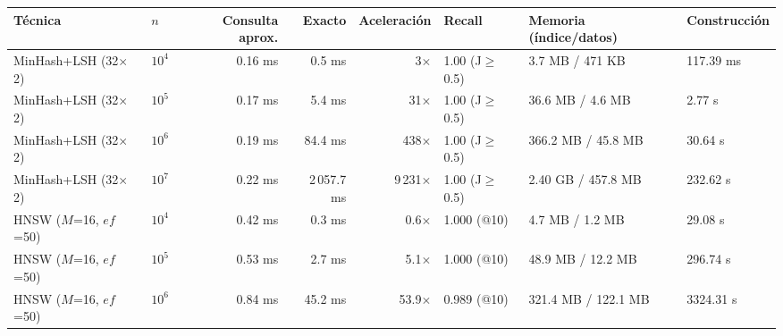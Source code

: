 \setlength{\tabcolsep}{4pt}
\begin{tabular}{@{}llrrrlll@{}}\toprule
Técnica & $n$ & Consulta aprox. & Exacto & Aceleración & Recall & Memoria (índice/datos) & Construcción \\\midrule
MinHash+LSH (32$\times$2) & $10^4$ & 0.16 ms & 0.5 ms & 3$\times$ & 1.00 (J$\ge$0.5) & 3.7 MB / 471 KB & 117.39 ms \\
MinHash+LSH (32$\times$2) & $10^5$ & 0.17 ms & 5.4 ms & 31$\times$ & 1.00 (J$\ge$0.5) & 36.6 MB / 4.6 MB & 2.77 s \\
MinHash+LSH (32$\times$2) & $10^6$ & 0.19 ms & 84.4 ms & 438$\times$ & 1.00 (J$\ge$0.5) & 366.2 MB / 45.8 MB & 30.64 s \\
MinHash+LSH (32$\times$2) & $10^7$ & 0.22 ms & 2\,057.7 ms & 9\,231$\times$ & 1.00 (J$\ge$0.5) & 2.40 GB / 457.8 MB & 232.62 s \\
HNSW ($M$=16, $ef$=50) & $10^4$ & 0.42 ms & 0.3 ms & 0.6$\times$ & 1.000 (@10) & 4.7 MB / 1.2 MB & 29.08 s \\
HNSW ($M$=16, $ef$=50) & $10^5$ & 0.53 ms & 2.7 ms & 5.1$\times$ & 1.000 (@10) & 48.9 MB / 12.2 MB & 296.74 s \\
HNSW ($M$=16, $ef$=50) & $10^6$ & 0.84 ms & 45.2 ms & 53.9$\times$ & 0.989 (@10) & 321.4 MB / 122.1 MB & 3324.31 s \\
\bottomrule\end{tabular}
